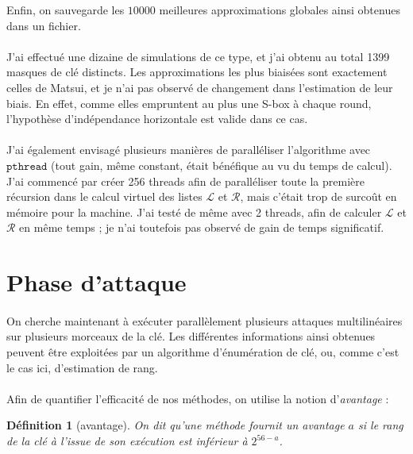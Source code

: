 \documentclass{scrartcl}
\newtheorem*{defi}{Définition}
\begin{document}
Enfin, on sauvegarde les $10000$ meilleures approximations globales ainsi obtenues dans un fichier.

\paragraph*{}
J'ai effectué une dizaine de simulations de ce type, et j'ai obtenu au total 1399 masques de clé distincts. Les
approximations les plus biaisées sont exactement celles de Matsui, et je n'ai pas
observé de changement dans l'estimation de leur biais. En effet, comme elles empruntent au plus une S-box à chaque
round, l'hypothèse d'indépendance horizontale est valide dans ce cas. 

\paragraph*{}
J'ai également envisagé plusieurs manières de paralléliser l'algorithme avec $\texttt{pthread}$ (tout gain, même constant, était bénéfique au vu
du temps de calcul). J'ai commencé par créer 256 threads afin de paralléliser toute
la première récursion dans le calcul virtuel des listes $\mathcal{L}$ et $\mathcal{R}$, mais c'était trop de surcoût
en mémoire pour la machine. J'ai testé de même avec 2 threads, afin de calculer $\mathcal{L}$ et $\mathcal{R}$
en même temps ; je n'ai toutefois pas observé de gain de temps significatif.

\section{Phase d'attaque}

\paragraph*{}
On cherche maintenant à exécuter parallèlement plusieurs attaques multilinéaires sur plusieurs
morceaux de la clé. Les différentes informations ainsi obtenues peuvent être exploitées par un algorithme
d'énumération de clé, ou, comme c'est le cas ici, d'estimation de rang.

\paragraph*{}
Afin de quantifier l'efficacité de nos méthodes, on utilise la notion d'\textit{avantage} :

\begin{defi}[avantage]
On dit qu'une méthode fournit un \textit{avantage} $a$ si le rang de la clé à l'issue de son exécution
est inférieur à $2^{56-a}$.
\end{defi}
\end{document}

